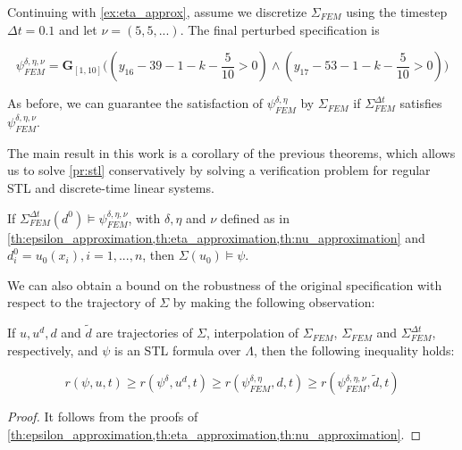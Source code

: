 \documentclass[oribibl]{llncs/llncs}
\newcommand{\Always}{\mathbf{G}}
\begin{document}
\begin{example}
    \label{ex:nu_approx}

    Continuing with \cref{ex:eta_approx}, assume we discretize $\Sigma_{FEM}$ using
    the timestep $\Delta t = 0.1$ and let $\nu = (5, 5, ...)$. The final
    perturbed specification is

    \begin{equation}
        \psi^{\delta, \eta, \nu}_{FEM} = \Always_{[1,10]} \bigl(
            (y_{16} - 39 - 1 - k - \frac{5}{10} > 0) \land (y_{17} - 53 - 1 - k
            - \frac{5}{10} > 0)
        \bigr)
    \end{equation}

    As before, we can guarantee the satisfaction of $\psi^{\delta,
    \eta}_{FEM}$ by $\Sigma_{FEM}$ if $\Sigma_{FEM}^{\Delta t}$ satisfies
    $\psi^{\delta, \eta, \nu}_{FEM}$.
    
\end{example}

The main result in this work is a corollary of the previous theorems, which
allows us to solve \cref{pr:stl}
conservatively by solving a verification problem for regular STL and discrete-time
linear systems. 

\begin{theorem}
    If $\Sigma_{FEM}^{\Delta t}(d^0) \models \psi^{\delta, \eta, \nu}_{FEM}$, with $\delta, \eta$
    and $\nu$ defined as in \cref{th:epsilon_approximation,th:eta_approximation,th:nu_approximation}
    and $d^0_i = u_0(x_i), i = 1,...,n$, then $\Sigma(u_0) \models \psi$.
\end{theorem}

We can also obtain a bound on the robustness of the
original specification with respect to the trajectory of $\Sigma$ by making the
following observation:

\begin{theorem}
    \label{th:robustness}
    If $u, u^d, d$ and $\tilde{d}$ are trajectories of $\Sigma$, interpolation
    of $\Sigma_{FEM}$, $\Sigma_{FEM}$ and $\Sigma_{FEM}^{\Delta t}$,
    respectively, and $\psi$ is an STL formula over $\Lambda$, then the 
    following inequality holds:

    \begin{equation}
        r(\psi, u, t) \geq r(\psi^{\delta}, u^d, t) \geq r(\psi^{\delta,
        \eta}_{FEM}, d, t) \geq r(\psi^{\delta, \eta, \nu}_{FEM}, \tilde{d}, t)
    \end{equation}
\end{theorem}
\begin{proof}
    It follows from the proofs of
    \cref{th:epsilon_approximation,th:eta_approximation,th:nu_approximation}.
\end{proof}
\end{document}
